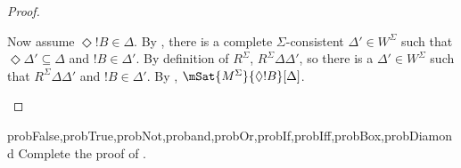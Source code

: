 \documentclass[../../../include/open-logic-section]{subfiles}
\begin{document}
\begin{proof}
\begin{enumerate}
{{{          Now assume $\Diamond !B \in \Delta$. By
          , there is a complete
          $\Sigma$-consistent $\Delta' \in W^\Sigma$ such that
          $\Diamond \Delta' \subseteq \Delta$ and $!B \in
          \Delta'$. By
          definition of $R^\Sigma$, $R^\Sigma \Delta\Delta'$, so there
          is a $\Delta' \in W^\Sigma$ such that $R^\Sigma
          \Delta\Delta'$ and $!B \in \Delta'$. By
          , $\mSat{M^\Sigma}{\Diamond
            !B}[\Delta]$.}}}{}
  \end{enumerate}
\end{proof}

\begin{probtag}{probFalse,probTrue,probNot,proband,probOr,probIf,probIff,probBox,probDiamond}
  Complete the proof of .
\end{probtag}
\end{document}
